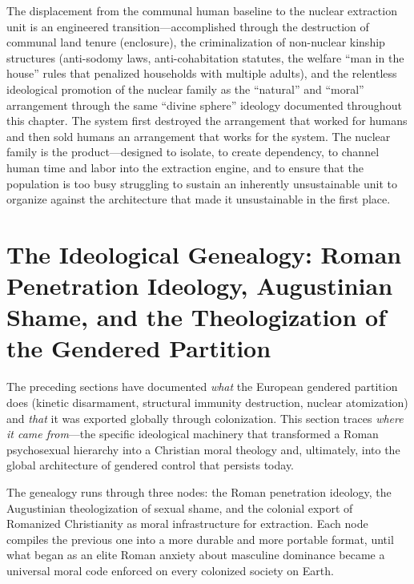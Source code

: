 The displacement from the communal human baseline to the nuclear extraction unit is an engineered transition---accomplished through the destruction of communal land tenure (enclosure), the criminalization of non-nuclear kinship structures (anti-sodomy laws, anti-cohabitation statutes, the welfare ``man in the house'' rules that penalized households with multiple adults), and the relentless ideological promotion of the nuclear family as the ``natural'' and ``moral'' arrangement through the same ``divine sphere'' ideology documented throughout this chapter. The system first destroyed the arrangement that worked for humans and then sold humans an arrangement that works for the system. The nuclear family is the product---designed to isolate, to create dependency, to channel human time and labor into the extraction engine, and to ensure that the population is too busy struggling to sustain an inherently unsustainable unit to organize against the architecture that made it unsustainable in the first place.

\section{The Ideological Genealogy: Roman Penetration Ideology, Augustinian Shame, and the Theologization of the Gendered Partition}

The preceding sections have documented \textit{what} the European gendered partition does (kinetic disarmament, structural immunity destruction, nuclear atomization) and \textit{that} it was exported globally through colonization. This section traces \textit{where it came from}---the specific ideological machinery that transformed a Roman psychosexual hierarchy into a Christian moral theology and, ultimately, into the global architecture of gendered control that persists today.

The genealogy runs through three nodes: the Roman penetration ideology, the Augustinian theologization of sexual shame, and the colonial export of Romanized Christianity as moral infrastructure for extraction. Each node compiles the previous one into a more durable and more portable format, until what began as an elite Roman anxiety about masculine dominance became a universal moral code enforced on every colonized society on Earth.

